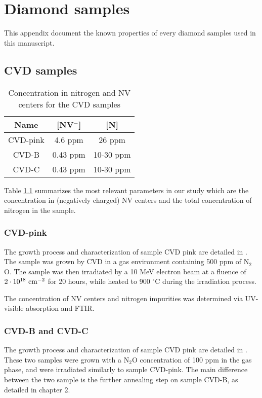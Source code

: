 \documentclass[a4paper,11pt]{report}
\title{}
\begin{document}
\chapter{Diamond samples}
This appendix document the known properties of every diamond samples used in this manuscript.

\section{CVD samples}
\begin{table}[htbp]
\centering
\caption{Concentration in nitrogen and NV centers for the CVD samples}
\label{Table samples CVD}
\begin{tabular}{c|cc}
\toprule
Name &  [NV$^-$]  & [N] \\
\midrule
CVD-pink & 4.6 ppm & 26 ppm \\
CVD-B & 0.43 ppm & 10-30 ppm \\
CVD-C & 0.43 ppm & 10-30 ppm \\

\bottomrule
\end{tabular}
\end{table}
Table \ref{Table samples CVD} summarizes the most relevant parameters in our study which are the concentration in (negatively charged) NV centers and the total concentration of nitrogen in the sample.
\subsection{CVD-pink}
The growth process and characterization of sample CVD pink are detailed in \citep{tallaire2020high}. The sample was grown by CVD in a gas environment containing 500 ppm of N$_2$O. The sample was then irradiated by a 10 MeV electron beam at a fluence of $2\cdot 10^{18}\ \rm cm^{-2}$ for 20 hours, while heated to 900 $^\circ$C during the irradiation process.

The concentration of NV centers and nitrogen impurities was determined via UV-visible absorption and FTIR.

\subsection{CVD-B and CVD-C}
The growth process and characterization of sample CVD pink are detailed in \citep{ngambou2022improving}. These two samples were grown with a N$_2$O concentration of 100 ppm in the gas phase, and were irradiated similarly to sample CVD-pink. The main difference between the two sample is the further annealing step on sample CVD-B, as detailed in chapter 2.
\end{document}
